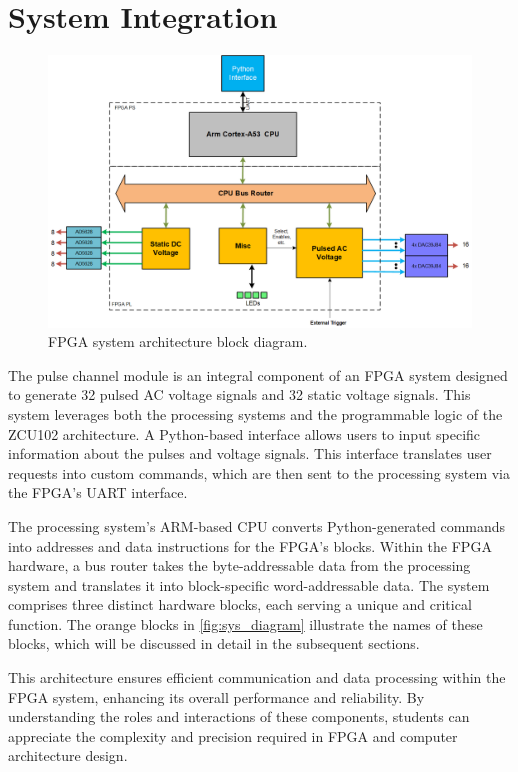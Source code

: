 \chapter{System Integration}


\begin{figure}[h]
    \centering
    \includegraphics[width=1\linewidth]{figures/5.1.png}
    \caption{FPGA system architecture block diagram.}
    \label{fig:sys_diagram}
\end{figure}

The pulse channel module is an integral component of an FPGA system designed to generate 32 pulsed AC voltage signals and 32 static voltage signals. This system leverages both the processing systems and the programmable logic of the ZCU102 architecture. A Python-based interface allows users to input specific information about the pulses and voltage signals. This interface translates user requests into custom commands, which are then sent to the processing system via the FPGA's UART interface.

The processing system's ARM-based CPU converts Python-generated commands into addresses and data instructions for the FPGA's blocks. Within the FPGA hardware, a bus router takes the byte-addressable data from the processing system and translates it into block-specific word-addressable data. The system comprises three distinct hardware blocks, each serving a unique and critical function. The orange blocks in \autoref{fig:sys_diagram} illustrate the names of these blocks, which will be discussed in detail in the subsequent sections.

This architecture ensures efficient communication and data processing within the FPGA system, enhancing its overall performance and reliability. By understanding the roles and interactions of these components, students can appreciate the complexity and precision required in FPGA and computer architecture design.

